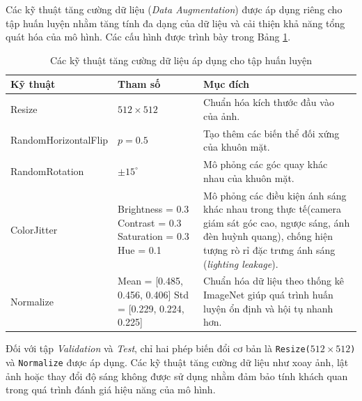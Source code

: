\documentclass[a4paper,12pt]{article}
\begin{document}
Các kỹ thuật tăng cường dữ liệu (\textit{Data Augmentation}) được áp dụng riêng cho tập huấn luyện nhằm tăng tính đa dạng của dữ liệu và cải thiện khả năng tổng quát hóa của mô hình. Các cấu hình được trình bày trong Bảng \ref{tab:data_augmentation}.

\begin{table}[H]
\centering
\caption{Các kỹ thuật tăng cường dữ liệu áp dụng cho tập huấn luyện}
\label{tab:data_augmentation}

\renewcommand{\arraystretch}{1.5}

\begin{tabularx}{\textwidth}
{|>{\raggedright\arraybackslash}p{4cm}
 |>{\raggedright\arraybackslash}p{4cm}
 |X|}
\hline

\rowcolor{headerblue}
\textbf{\color{white}Kỹ thuật}
&
\textbf{\color{white}Tham số}
&
\textbf{\color{white}Mục đích}
\\ \hline

Resize
&
$512 \times 512$
&
Chuẩn hóa kích thước đầu vào của ảnh.
\\ \hline

RandomHorizontalFlip
&
$p = 0.5$
&
Tạo thêm các biến thể đối xứng của khuôn mặt.
\\ \hline

RandomRotation
&
$\pm 15^\circ$
&
Mô phỏng các góc quay khác nhau của khuôn mặt.
\\ \hline

ColorJitter
&
Brightness = 0.3 \newline
Contrast = 0.3 \newline
Saturation = 0.3 \newline
Hue = 0.1
&
Mô phỏng các điều kiện ánh sáng khác nhau trong thực tế(camera giám sát góc cao, ngược sáng, ánh đèn huỳnh quang), chống hiện tượng rò rỉ đặc trưng ánh sáng (\textit{lighting leakage}).
\\ \hline

Normalize
&
Mean = [0.485, 0.456, 0.406] \newline
Std = [0.229, 0.224, 0.225]
&
Chuẩn hóa dữ liệu theo thống kê ImageNet giúp quá trình huấn luyện ổn định và hội tụ nhanh hơn.
\\ \hline

\end{tabularx}
\end{table}

Đối với tập \textit{Validation} và \textit{Test}, chỉ hai phép biến đổi cơ bản là \texttt{Resize($512 \times 512$)} và \texttt{Normalize} được áp dụng. Các kỹ thuật tăng cường dữ liệu như xoay ảnh, lật ảnh hoặc thay đổi độ sáng không được sử dụng nhằm đảm bảo tính khách quan trong quá trình đánh giá hiệu năng của mô hình.
\end{document}
